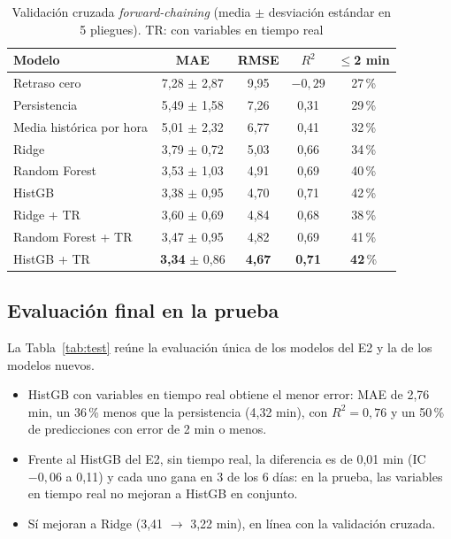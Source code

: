 \documentclass[conference,spanish]{IEEEtran}
\begin{document}
\begin{table}[h]
\centering
\caption{Validación cruzada \textit{forward-chaining} (media $\pm$ desviación estándar en 5 pliegues). TR: con variables en tiempo real}
\label{tab:cv}
\footnotesize
\begin{tabular}{@{}lcccc@{}}
\toprule
\textbf{Modelo} & \textbf{MAE} & \textbf{RMSE} & \textbf{$R^2$} & \textbf{$\le$2 min}\\
\midrule
Retraso cero & 7,28 $\pm$ 2,87 & 9,95 & $-0{,}29$ & 27\,\%\\
Persistencia & 5,49 $\pm$ 1,58 & 7,26 & 0,31 & 29\,\%\\
Media histórica por hora & 5,01 $\pm$ 2,32 & 6,77 & 0,41 & 32\,\%\\
Ridge & 3,79 $\pm$ 0,72 & 5,03 & 0,66 & 34\,\%\\
Random Forest & 3,53 $\pm$ 1,03 & 4,91 & 0,69 & 40\,\%\\
HistGB & 3,38 $\pm$ 0,95 & 4,70 & 0,71 & 42\,\%\\
Ridge + TR & 3,60 $\pm$ 0,69 & 4,84 & 0,68 & 38\,\%\\
Random Forest + TR & 3,47 $\pm$ 0,95 & 4,82 & 0,69 & 41\,\%\\
HistGB + TR & \textbf{3,34} $\pm$ 0,86 & \textbf{4,67} & \textbf{0,71} & \textbf{42}\,\%\\
\bottomrule
\end{tabular}
\end{table}

\subsection{Evaluación final en la prueba}
La Tabla~\ref{tab:test} reúne la evaluación única de los modelos del E2 y la de los modelos nuevos.
\begin{itemize}
    \item HistGB con variables en tiempo real obtiene el menor error: MAE de 2,76 min, un 36\,\% menos que la persistencia (4,32 min), con $R^2=0{,}76$ y un 50\,\% de predicciones con error de 2 min o menos.
    \item Frente al HistGB del E2, sin tiempo real, la diferencia es de 0,01 min (IC $-0{,}06$ a 0,11) y cada uno gana en 3 de los 6 días: en la prueba, las variables en tiempo real no mejoran a HistGB en conjunto.
    \item Sí mejoran a Ridge (3,41 $\to$ 3,22 min), en línea con la validación cruzada.
\end{itemize}
\end{document}
